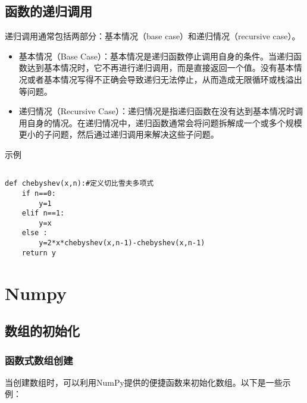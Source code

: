 \documentclass{article}
\begin{document}
\subsection{函数的递归调用}
递归调用通常包括两部分：基本情况（base case）和递归情况（recursive case）。
\begin{itemize}
    

\item 基本情况（Base Case）：基本情况是递归函数停止调用自身的条件。当递归函数达到基本情况时，它不再进行递归调用，而是直接返回一个值。没有基本情况或者基本情况写得不正确会导致递归无法停止，从而造成无限循环或栈溢出等问题。

\item 递归情况（Recursive Case）：递归情况是指递归函数在没有达到基本情况时调用自身的情况。在递归情况中，递归函数通常会将问题拆解成一个或多个规模更小的子问题，然后通过递归调用来解决这些子问题。
\end{itemize}
示例

\begin{lstlisting}[caption={示例Python代码}]

def chebyshev(x,n):#定义切比雪夫多项式
    if n==0:
        y=1
    elif n==1:
        y=x
    else :
        y=2*x*chebyshev(x,n-1)-chebyshev(x,n-1)        
    return y
\end{lstlisting}
\section{Numpy}
\subsection{数组的初始化}
\subsubsection{函数式数组创建}
当创建数组时，可以利用NumPy提供的便捷函数来初始化数组。以下是一些示例：
\end{document}
